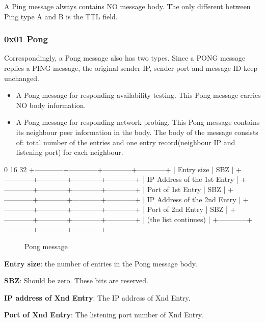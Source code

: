 \documentclass[12pt, a4paper]{article}
\begin{document}
A Ping message always contains NO message body.
The only different between Ping type A and B is the TTL field.

\subsubsection{0x01 Pong}
Correspondingly, a Pong message also has two types.
Since a PONG message replies a PING message, the original sender IP, sender port and message ID keep unchanged.
\begin{itemize}
\item A Pong message for responding availability testing.
This Pong message carries NO body information.
\item A Pong message for responding network probing.
This Pong message contains its neighbour peer information in the body.
The body of the message consists of: total number of the entries and one entry record(neighbour IP and listening port) for each neighbour.
\end{itemize}

\begin{verbbox}
0                          16                        32
+------------+------------+------------+------------+
|        Entry size       |           SBZ           |
+------------+------------+------------+------------+
|               IP Address of the 1st Entry         |
+------------+------------+------------+------------+
|   Port of 1st Entry     |    	      SBZ           |
+------------+------------+------------+------------+
|               IP Address of the 2nd Entry         |
+------------+------------+------------+------------+
|   Port of 2nd Entry     |    	      SBZ           |
+------------+------------+------------+------------+
|   (the list continues)                            |
+------------+------------+------------+------------+
\end{verbbox}

\begin{figure}[h!]
  \centering
  \theverbbox
  \label{header}
  \caption{Pong message}
\end{figure}

\textbf{Entry size}: the number of entries in the Pong message body.

\textbf{SBZ}: Should be zero. These bits are reserved.

\textbf{IP address of Xnd Entry}: The IP address of Xnd Entry.

\textbf{Port of Xnd Entry}: The listening port number of Xnd Entry.
\end{document}
